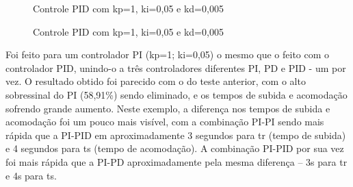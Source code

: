 \documentclass[a4paper,12pt]{article}
\begin{document}
\begin{figure}[H]
\hspace{1cm}
\caption{Controle PID com kp=1, ki=0,05 e kd=0,005}
     \label{fig:ControlePID11}
\end{figure}
\begin{figure}[H]
     \centering
\hspace{1cm}
     \caption{Controle PID com kp=1, ki=0,05 e kd=0,005}
     \label{fig:ControlePID12}
\end{figure}


Foi feito para um controlador PI (kp=1; ki=0,05) o mesmo que o feito com o controlador PID, unindo-o a três controladores diferentes PI, PD e PID - um por vez. O resultado obtido foi parecido com o do teste anterior, com o alto sobressinal do PI (58,91\%) sendo eliminado, e os tempos de subida e acomodação sofrendo grande aumento. Neste exemplo, a diferença nos tempos de subida e acomodação foi um pouco mais visível, com a combinação PI-PI sendo mais rápida que a PI-PID em aproximadamente 3 segundos para tr (tempo de subida) e 4 segundos para ts (tempo de acomodação). A combinação PI-PID por sua vez foi mais rápida que a PI-PD aproximadamente pela mesma diferença – 3s para tr e 4s para ts.
\\
\end{document}
